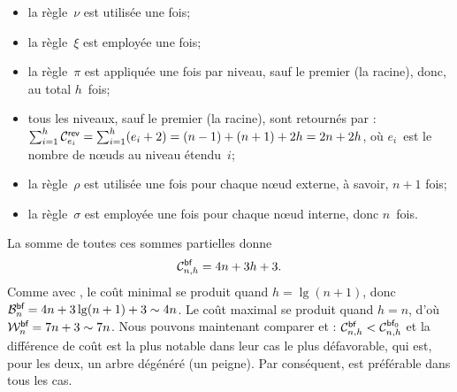 \begin{itemize}

  \item la règle~\(\nu\) est utilisée une fois;

  \item la règle~\(\xi\) est employée une fois;

  \item la règle~\(\pi\) est appliquée une fois par niveau, sauf le
    premier (la racine), donc, au total \(h\)~fois;

  \item tous les niveaux, sauf le premier (la racine), sont retournés
    par : \(\sum_{i=1}^{h}\C{\fun{rev}}{e_i} =
    \sum_{i=1}^{h}(e_i+2) = (n-1)+(n+1)+ 2h = 2n +
    2h\), où \(e_i\)~est le nombre de
    nœuds au niveau étendu~\(i\);

  \item la règle~\(\rho\) est utilisée une fois pour chaque nœud
    externe, à savoir, \(n+1\) fois;

  \item la règle~\(\sigma\) est employée une fois pour chaque nœud
    interne, donc \(n\)~fois.

\end{itemize}
La somme de toutes ces sommes partielles donne
\begin{equation*}
\C{\fun{bf}}{n,h} = 4n + 3h + 3.\index{bf@$\C{\fun{bf}}{n,h}$}
\end{equation*}
Comme avec , le coût
minimal se produit quand \(h = \lg(n+1)\), donc \(\B{\fun{bf}}{n} = 4n
+ 3\lg(n+1) + 3 \sim 4n\). Le coût
maximal se produit quand \(h=n\), d'où \(\W{\fun{bf}}{n} = 7n + 3 \sim
7n\). Nous pouvons maintenant comparer
 et
: \(\C{\fun{bf}}{n,h} <
\C{\fun{bf}_0}{n,h}\)
 et la différence de coût est la plus
notable dans leur cas le plus défavorable, qui est, pour les deux, un
arbre dégénéré (un peigne). Par conséquent,  est préférable
dans tous les cas.

